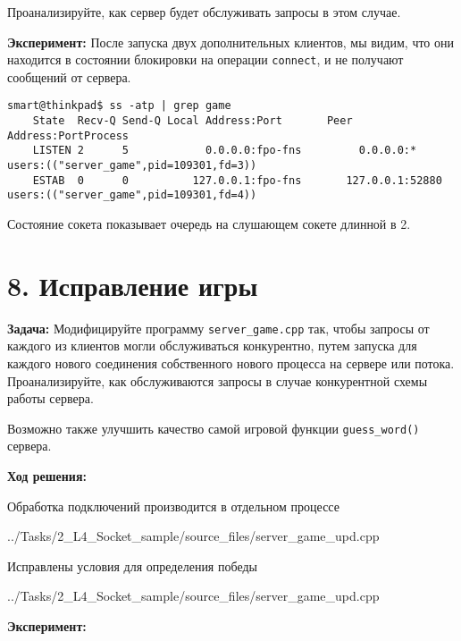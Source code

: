 Проанализируйте, как сервер будет обслуживать запросы в этом случае.

\textbf{Эксперимент:} После запуска двух дополнительных клиентов, мы видим, что они находится в состоянии блокировки на операции \texttt{connect}, и не получают сообщений от сервера.

\begin{Verbatim}[frame=single,breaklines=true,breakanywhere=true]
    smart@thinkpad$ ss -atp | grep game
    State  Recv-Q Send-Q Local Address:Port       Peer Address:PortProcess
    LISTEN 2      5            0.0.0.0:fpo-fns         0.0.0.0:*         users:(("server_game",pid=109301,fd=3))
    ESTAB  0      0          127.0.0.1:fpo-fns       127.0.0.1:52880     users:(("server_game",pid=109301,fd=4))
\end{Verbatim}
Состояние сокета показывает очередь на слушающем сокете длинной в 2.

\section*{8. Исправление игры}
\textbf{Задача:} Модифицируйте программу \texttt{server\_game.cpp} так, чтобы запросы от каждого из клиентов могли обслуживаться конкурентно, путем запуска для каждого нового соединения собственного нового процесса на сервере или потока. Проанализируйте, как обслуживаются запросы в случае конкурентной схемы работы сервера.

Возможно также улучшить качество самой игровой функции \texttt{guess\_word()} сервера.

\textbf{Ход решения:}

Обработка подключений производится в отдельном процессе

{../Tasks/2_L4_Socket_sample/source_files/server_game_upd.cpp}

Исправлены условия для определения победы

{../Tasks/2_L4_Socket_sample/source_files/server_game_upd.cpp}

\textbf{Эксперимент:}

